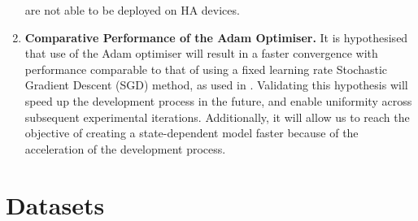 \documentclass[logo,bsc,singlespacing,parskip,online]{infthesis}
\begin{document}
\begin{enumerate}
   are not able to be deployed on HA devices.
   \item \textbf{Comparative Performance of the Adam Optimiser.}
   It is hypothesised that use of the Adam optimiser will result in a faster convergence with performance comparable to that of using a fixed learning rate Stochastic Gradient Descent (SGD) method, as used in \citet{Huwel2020HearDS}.
   Validating this hypothesis will speed up the development process in the future, 
   and enable uniformity across subsequent experimental iterations. Additionally,
   it will allow us to reach the objective of creating a state-dependent model faster because of the acceleration of the development process.
\end{enumerate}

\section{Datasets}
\label{sec:datasets}

\end{document}
